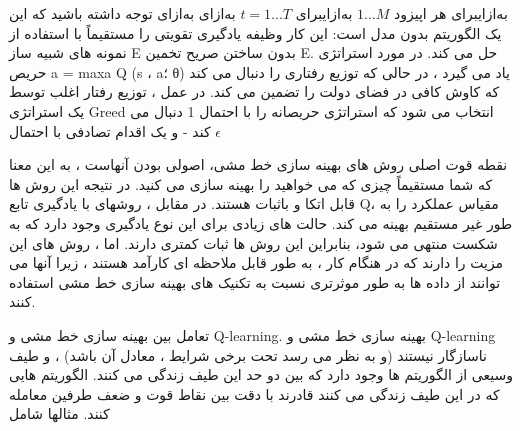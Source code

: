 \‌به‌ازای{برای هر اپیزود 
$1...M$}
  \‌به‌ازای{برای $t=1...T$}
  ‌به‌ازای
‌به‌ازای
توجه داشته باشید که این یک الگوریتم بدون مدل است: این کار وظیفه یادگیری تقویتی را مستقیماً با استفاده از نمونه های شبیه ساز E بدون ساختن صریح تخمین E. حل می کند.
در مورد استراتژی حریص a = maxa Q (s ، a؛ θ) یاد می گیرد ، در حالی که توزیع رفتاری را دنبال می کند که
کاوش کافی در فضای دولت را تضمین می کند. در عمل ، توزیع رفتار اغلب توسط یک استراتژی Greed انتخاب می شود که استراتژی حریصانه را با احتمال 1 دنبال می کند - و یک
اقدام تصادفی با احتمال $\epsilon$




نقطه قوت اصلی روش های بهینه سازی خط مشی، اصولی بودن آنهاست ، به این معنا که شما مستقیماً چیزی که می خواهید را بهینه سازی می کنید. در نتیجه این روش ها قابل اتکا و باثبات هستند. در مقابل ، روشهای 
با یادگیری تابع Q، مقیاس عملکرد را به طور غیر مستقیم بهینه می کند. حالت های زیادی برای این نوع یادگیری وجود دارد که به شکست منتهی می شود، بنابراین این روش ها  ثبات کمتری دارند. 
\cite{suttonbook}
اما ، روش های 
این مزیت را دارند که در هنگام کار ، به طور قابل ملاحظه ای کارآمد هستند ، زیرا آنها می توانند از داده ها به طور موثرتری نسبت به تکنیک های بهینه سازی خط مشی استفاده کنند.


تعامل بین بهینه سازی خط مشی و Q-learning. بهینه سازی خط مشی و Q-learning ناسازگار نیستند (و به نظر می رسد تحت برخی شرایط ، معادل آن باشد) ، و طیف وسیعی از الگوریتم ها وجود دارد که بین دو حد این طیف زندگی می کنند. الگوریتم هایی که در این طیف زندگی می کنند قادرند با دقت بین نقاط قوت و ضعف طرفین معامله کنند. مثالها شامل

